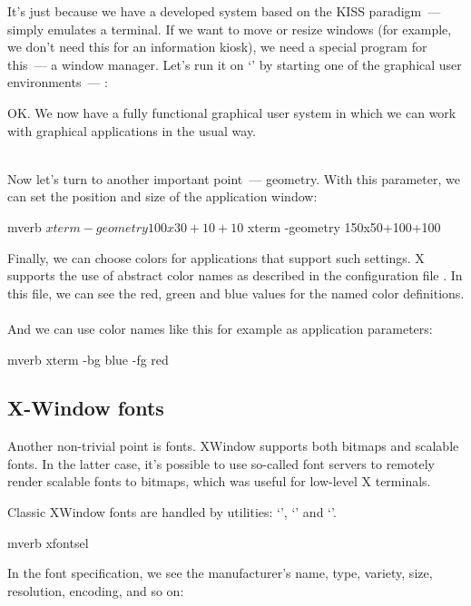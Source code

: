 It's just because we have a developed system based on the KISS paradigm~---
 simply emulates a terminal. If we want to move or resize windows
(for example, we don't need this for an information kiosk), we need a special
program for this~--- a window manager. Let's run it on `'
by starting one of the graphical user environments~--- :
OK. We now have a fully functional graphical user system in which we can
work with graphical applications in the usual way.

\noindent
{}\\
Now let's turn to another important point~--- geometry. With this parameter,
we can set the position and size of the application window:
\begin{code}{mverb}
$ xterm -geometry 100x30+10+10
$ xterm -geometry 150x50+100+100
\end{code} 

Finally, we can choose colors for applications that support such settings.
X supports the use of abstract color names as described in the configuration
file . In this file, we can see the red, green
and blue values for the named color definitions.\\
\\
And we can use color names like this for example as application parameters:
\begin{code}{mverb}
 xterm -bg blue -fg red
\end{code}

\subsection*{X-Window fonts} %

Another non-trivial point is fonts. XWindow supports both bitmaps and
scalable fonts. In the latter case, it's possible to use so-called font
servers to remotely render scalable fonts to bitmaps, which was useful
for low-level X terminals.

Classic XWindow fonts are handled by utilities: `', `'
and `'.
\begin{code}{mverb}
xfontsel
\end{code}
In the font specification, we see the manufacturer's name, type, variety, size,
resolution, encoding, and so on:\\

